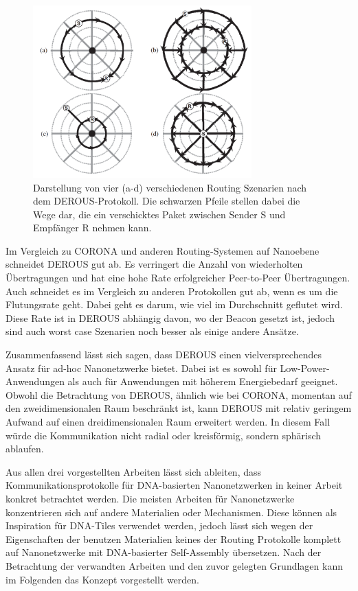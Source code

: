 \begin{figure}
    \centering
    \includegraphics[width=0.75\textwidth]{images/Derous.png}
    \caption[DEROUS Protokoll Szenarien]{Darstellung von vier (a-d) verschiedenen Routing Szenarien nach dem DEROUS-Protokoll. Die schwarzen Pfeile stellen dabei die Wege dar, die ein verschicktes Paket zwischen Sender S und Empfänger R nehmen kann. \cite{liaskos2015sdm}}
    \label{fig:derous}
\end{figure}

Im Vergleich zu CORONA und anderen Routing-Systemen auf Nanoebene schneidet DEROUS gut ab. Es verringert die Anzahl von wiederholten Übertragungen und hat eine hohe Rate erfolgreicher Peer-to-Peer Übertragungen. Auch schneidet es im Vergleich zu anderen Protokollen gut ab, wenn es um die Flutungsrate geht. Dabei geht es darum, wie viel im Durchschnitt geflutet wird. Diese Rate ist in DEROUS abhängig davon, wo der Beacon gesetzt ist, jedoch sind auch worst case Szenarien noch besser als einige andere Ansätze.

Zusammenfassend lässt sich sagen, dass DEROUS einen vielversprechendes Ansatz für ad-hoc Nanonetzwerke bietet. Dabei ist es sowohl für Low-Power-Anwendungen als auch für Anwendungen mit höherem Energiebedarf geeignet. Obwohl die Betrachtung von DEROUS, ähnlich wie bei CORONA, momentan auf den zweidimensionalen Raum beschränkt ist, kann DEROUS mit relativ geringem Aufwand auf einen dreidimensionalen Raum erweitert werden. In diesem Fall würde die Kommunikation nicht radial oder kreisförmig, sondern sphärisch ablaufen.

Aus allen drei vorgestellten Arbeiten lässt sich ableiten, dass Kommunikationsprotokolle für DNA-basierten Nanonetzwerken in keiner Arbeit konkret betrachtet werden. Die meisten Arbeiten für Nanonetzwerke konzentrieren sich auf andere Materialien oder Mechanismen. Diese können als Inspiration für DNA-Tiles verwendet werden, jedoch lässt sich wegen der Eigenschaften der benutzen Materialien keines der Routing Protokolle komplett auf Nanonetzwerke mit DNA-basierter Self-Assembly übersetzen.
Nach der Betrachtung der verwandten Arbeiten und den zuvor gelegten Grundlagen kann im Folgenden das Konzept vorgestellt werden.
